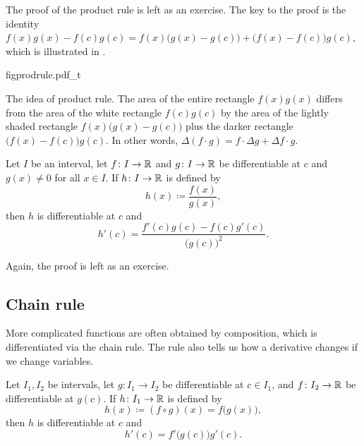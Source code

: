 The proof of the product rule is left as an exercise.  The key to the proof is 
the identity
$f(x) g(x) - f(c) g(c) =
f(x)\bigl( g(x) - g(c) \bigr)
+ \bigl( f(x) - f(c) \bigr) g(c)$,
which is illustrated in .
\begin{myfigureht}
{figprodrule.pdf_t}
\caption{The idea of product rule.  The area of the entire rectangle
$f(x)g(x)$ differs from the area of the white rectangle $f(c)g(c)$
by the area of the lightly shaded rectangle
$f(x)\bigl( g(x) - g(c) \bigr)$ plus the darker rectangle
$\bigl( f(x) - f(c) \bigr) g(c)$.
In other words, $\Delta (f \cdot g)
= f \cdot \Delta g + \Delta f \cdot g$.\label{figprodrule}}
\end{myfigureht}



\begin{prop}
Let $I$ be an interval, let
$f \colon I \to {\mathbb{R}}$ and $g \colon I \to {\mathbb{R}}$ be differentiable at $c$
and $g(x) \not= 0$ for all $x \in I$.
If $h \colon I \to {\mathbb{R}}$
is defined by
\begin{equation*}
h(x) \coloneqq \frac{f(x)}{g(x)},
\end{equation*}
then $h$ is differentiable at $c$ and
\begin{equation*}
h'(c) = \frac{f'(c) g(c) - f(c) g'(c)}{{\bigl(g(c)\bigr)}^2} .
\end{equation*}
\end{prop}

Again, the proof is left as an exercise.

\subsection{Chain rule}

More complicated functions are often obtained by composition,
which is differentiated via the chain rule.  The rule also tells us
how a derivative changes if we change variables.

\begin{prop}
Let $I_1, I_2$ be intervals, let
$g \colon I_1 \to I_2$ be differentiable at $c \in I_1$,
and
$f \colon I_2 \to {\mathbb{R}}$ be differentiable at $g(c)$.
If $h \colon I_1 \to {\mathbb{R}}$
is defined by
\begin{equation*}
h(x) \coloneqq (f \circ g) (x) = f\bigl(g(x)\bigr) ,
\end{equation*}
then $h$ is differentiable at $c$ and
\begin{equation*}
h'(c) = f'\bigl(g(c)\bigr)g'(c) .
\end{equation*}
\end{prop}


